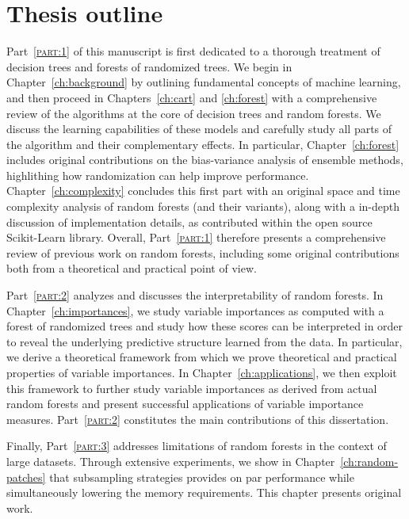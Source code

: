 \section{Thesis outline}

Part~\textsc{\ref{part:1}} of this manuscript is first dedicated to a thorough
treatment of decision trees and forests of randomized trees. We begin in
Chapter~\ref{ch:background} by outlining fundamental concepts of machine
learning, and then proceed in Chapters~\ref{ch:cart} and \ref{ch:forest} with a
comprehensive review of the algorithms at the core of decision trees and random
forests. We discuss the learning capabilities of these models and carefully
study all parts of the algorithm and their complementary effects. In particular,
Chapter~\ref{ch:forest} includes original contributions on the bias-variance
analysis of ensemble methods, highlithing how randomization can help improve
performance. Chapter~\ref{ch:complexity} concludes this first part with an
original space and time complexity analysis of random forests (and their
variants), along with a in-depth discussion of implementation details,
as contributed within the open source Scikit-Learn library.
Overall, Part~\textsc{\ref{part:1}} therefore presents a comprehensive review
of previous work on random forests, including some original contributions
both from a theoretical and practical point of view.

Part~\textsc{\ref{part:2}} analyzes and discusses the interpretability of
random forests. In Chapter~\ref{ch:importances}, we study variable importances
as computed with a forest of randomized trees and study how these scores can be
interpreted in order to reveal the underlying predictive structure learned from
the data. In particular, we derive a theoretical framework from which we prove
theoretical and practical properties of variable importances. In
Chapter~\ref{ch:applications}, we then exploit this framework to further study
variable importances as derived from actual random forests and present
successful applications of variable importance measures.
Part~\textsc{\ref{part:2}} constitutes the main contributions of this
dissertation.

Finally, Part~\textsc{\ref{part:3}} addresses limitations of random forests in
the context of large datasets. Through extensive experiments, we show in
Chapter~\ref{ch:random-patches} that subsampling strategies provides on par
performance while simultaneously lowering the memory requirements. This
chapter presents original work.

